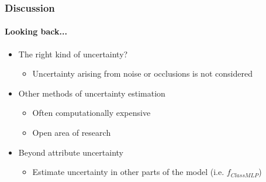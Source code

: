 \documentclass[9pt]{beamer}
\begin{document}
\begin{frame}
\frametitle{Discussion}
\framesubtitle{Looking back...}
\begin{itemize}
	\item The right kind of uncertainty?
	\begin{itemize}
		\item Uncertainty arising from noise or occlusions is not considered
	\end{itemize}
	\item Other methods of uncertainty estimation
	\begin{itemize}
		\item Often computationally expensive
		\item Open area of research
	\end{itemize}
	\item Beyond attribute uncertainty
	\begin{itemize}
		\item Estimate uncertainty in other parts of the model (i.e. $f_{ClassMLP}$)
	\end{itemize}
\end{itemize}
\end{frame} 
\end{document}
